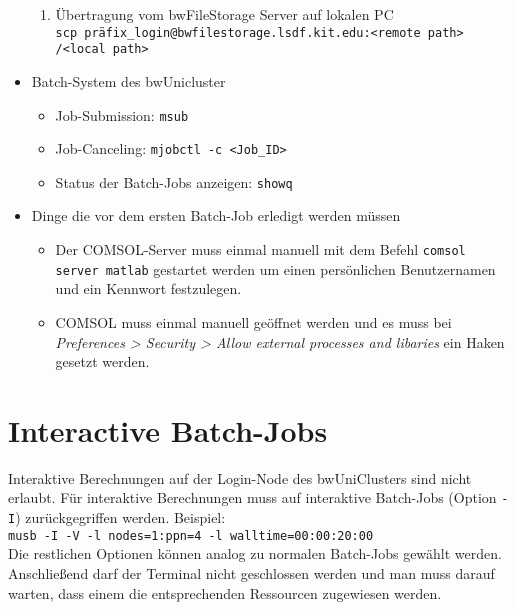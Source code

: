 \documentclass[12pt]{scrartcl}%
\theoremstyle{nonumberplain}
\begin{document}
\begin{itemize}
\begin{enumerate}
\item Übertragung vom bwFileStorage Server auf lokalen PC \\ \texttt{scp präfix\_login@bwfilestorage.lsdf.kit.edu:<remote path> /<local path>}
\end{enumerate}
\item Batch-System des bwUnicluster
\begin{itemize}
\item Job-Submission: \texttt{msub}
\item Job-Canceling: \texttt{mjobctl -c <Job\_ID>}
\item Status der Batch-Jobs anzeigen: \texttt{showq}
\end{itemize}
\item Dinge die vor dem ersten Batch-Job erledigt werden müssen
\begin{itemize}
\item Der COMSOL-Server muss einmal manuell mit dem Befehl \texttt{comsol server matlab} gestartet werden um einen persönlichen Benutzernamen und ein Kennwort festzulegen.
\item COMSOL muss einmal manuell geöffnet werden und es muss bei \textit{Preferences > Security > Allow external processes and libaries} ein Haken gesetzt werden.
\end{itemize}
\end{itemize}

\section{Interactive Batch-Jobs}
Interaktive Berechnungen auf der Login-Node des bwUniClusters sind nicht erlaubt. Für interaktive Berechnungen muss auf interaktive Batch-Jobs (Option \texttt{-I}) zurückgegriffen werden. Beispiel:\\
\hspace*{0.5cm} \texttt{musb -I -V -l nodes=1:ppn=4 -l walltime=00:00:20:00} \\
Die restlichen Optionen können analog zu normalen Batch-Jobs gewählt werden.\\
Anschließend darf der Terminal nicht geschlossen werden und man muss darauf warten, dass einem die entsprechenden Ressourcen zugewiesen werden.
\end{document}
